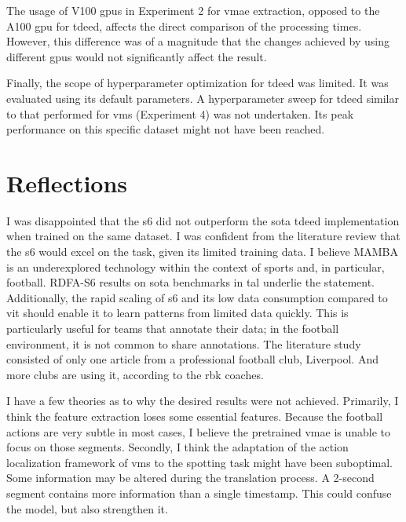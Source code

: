 The usage of V100 \acrshort{gpu}s in Experiment 2 for \acrshort{vmae} extraction, opposed to the A100 \acrshort{gpu} for \acrshort{tdeed}, affects the direct comparison of the processing times. However, this difference was of a magnitude that the changes achieved by using different \acrshort{gpu}s would not significantly affect the result. 

Finally, the scope of hyperparameter optimization for \acrshort{tdeed} was limited. It was evaluated using its default parameters. A hyperparameter sweep for \acrshort{tdeed} similar to that performed for \acrshort{vms} (Experiment 4) was not undertaken. Its peak performance on this specific dataset might not have been reached. 

\section{Reflections}

I was disappointed that the \acrfull{s6} did not outperform the \acrshort{sota} \acrshort{tdeed} implementation when trained on the same dataset. I was confident from the literature review that the \acrshort{s6} would excel on the task, given its limited training data. I believe MAMBA is an underexplored technology within the context of sports\cite{survey_of_survey} and, in particular, football\cite{seweryn_survey_2023}. RDFA-S6\cite{lee_enhancing_mamba_s6_2024} results on \acrshort{sota} benchmarks in \acrshort{tal} underlie the statement. Additionally, the rapid scaling of \acrshort{s6} and its low data consumption compared to \acrfull{vit} should enable it to learn patterns from limited data quickly. This is particularly useful for teams that annotate their data; in the football environment, it is not common to share annotations. The literature study consisted of only one article from a professional football club, Liverpool. And more clubs are using it, according to the \acrshort{rbk} coaches. 

I have a few theories as to why the desired results were not achieved. Primarily, I think the feature extraction loses some essential features. Because the football actions are very subtle in most cases, I believe the pretrained \acrshort{vmae} is unable to focus on those segments. Secondly, I think the adaptation of the action localization framework of \acrshort{vms} to the spotting task might have been suboptimal. Some information may be altered during the translation process. A 2-second segment contains more information than a single timestamp. This could confuse the model, but also strengthen it. 

